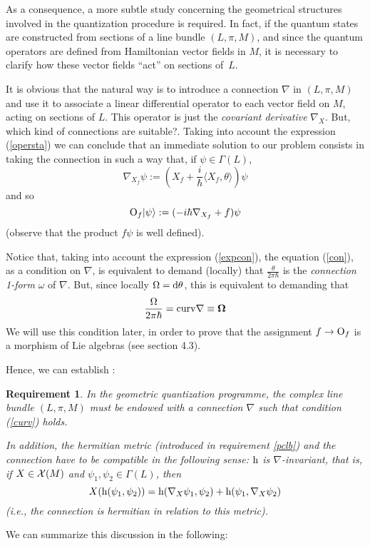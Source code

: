 \documentclass[12pt]{article}
\newtheorem{require}{Requirement}
\def\beq{\begin{equation}}
\def\eeq{\end{equation}}
\def\dst{\(}
\def\d{{\rm d}}
\def\sta{|\psi \rangle }
\def\Op{{\rm O}}
\def\h{{\rm h}}
\def\curv{{\bf \Omega}}
\begin{document}
As a consequence,
a more subtle study concerning the
geometrical structures involved in the
quantization procedure is required.
In fact, if the quantum states are constructed from
sections of a line bundle $(L,\pi ,M)$,
and since the quantum operators
are defined from Hamiltonian vector fields in $M$,
it is necessary to clarify how
these vector fields ``act'' on sections of~$L$.

It is obvious that the natural way
is to introduce a connection $\nabla$
in $(L,\pi ,M)$
and use it to associate a
linear differential operator to each
vector field on $M$, acting on sections of $L$.
This operator is just the
{\it covariant derivative}
$\nabla_X$.
But, which kind of connections are suitable?.
Taking into account the expression
(\ref{opersta})
we can conclude that an immediate
solution to our problem consists in taking
the connection in such a way that,
if $\psi \in \Gamma (L)$,
\beq
\nabla_{X_f}\psi :=
(X_f + \frac{i}{\hbar}\langle X_f,\theta \rangle )\psi
\label{con}
\eeq
and so
$$
\Op_f\sta :=
(-i\hbar \nabla_{X_f} + f)\psi
$$
(observe that the product $f\psi$ is well defined).

Notice that, taking into account the expression (\ref{expcon}),
the equation (\ref{con}), as a condition on $\nabla$,
is equivalent to demand (locally) that
\dst\frac{\theta}{2\pi \hbar}\)
is the {\it connection 1-form} $\omega$ of $\nabla$.
But, since locally $\Omega=\d \theta$,
this is equivalent to demanding that
\beq
\frac{\Omega}{2\pi\hbar} = {\rm curv} \nabla \equiv \curv
\label{curv}
\eeq
We will use this condition later, in order to prove that the assignment
$f \to \Op_f$ is a morphism of Lie algebras (see section 4.3).

Hence, we can establish
\cite{SW-76}:

\begin{require}
In the geometric quantization programme,
the complex line bundle
$(L,\pi ,M)$
must be endowed with a
{\rm connection} $\nabla$
such that condition
(\ref{curv})
holds.

In addition, the hermitian metric
(introduced in requirement \ref{pclb})
and the connection have to be {\rm compatible}
in the following sense: $\h$ is $\nabla$-invariant, that is,
if $X \in {\cal X}(M)$ and $\psi_1,\psi_2 \in \Gamma (L)$, then
$$
X(\h (\psi_1,\psi_2)) =
\h (\nabla_X\psi_1,\psi_2) +
\h (\psi_1,\nabla_X\psi_2)
$$
(i.e., the connection is hermitian in relation to this metric).
\label{connec}
\end{require}

We can summarize this discussion in the following:
\end{document}
